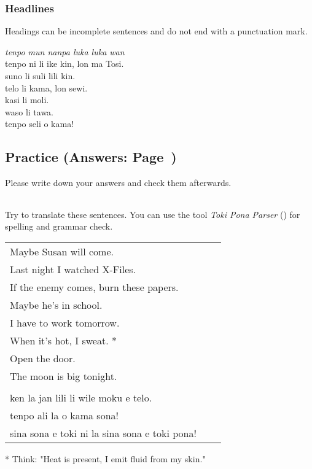 \subsubsection*{Headlines} 
%
Headings can be incomplete sentences and do not end with a punctuation mark.

\textit{tenpo mun nanpa luka luka wan} \\
tenpo ni li ike kin, lon ma Tosi. \\
suno li suli lili kin. \\ 
telo li kama, lon sewi. \\
kasi li moli. \\
waso li tawa. \\
tenpo seli o kama! 

\newpage
\subsection*{Practice (Answers: Page~\pageref{'la'})}
%
Please write down your answers and check them afterwards. 

\begin{supertabular}{p{5,5cm}|ll}

\end{supertabular} 

Try to translate these sentences. 
You can use the tool \textit{Toki Pona Parser} (\cite{www:rowa:02}) for spelling and grammar check. 

\begin{supertabular}{p{5,5cm}|ll}
Maybe Susan will come.  && \\ %
Last night I watched X-Files.  &&   \\ %
If the enemy comes, burn these papers.  &&   \\ %
Maybe he's in school.  &&   \\ %
I have to work tomorrow.  &&   \\ %
When it's hot, I sweat. *  &&  \\ %
Open the door.   &&  \\ %
The moon is big tonight.   &&  \\ %
 && \\ %
ken la jan lili li wile moku e telo.  &&   \\ %
tenpo ali la o kama sona!   &&  \\ %
sina sona e toki ni la sina sona e toki pona!   &&  \\ %
\end{supertabular}

* Think: "Heat is present, I emit fluid from my skin."
